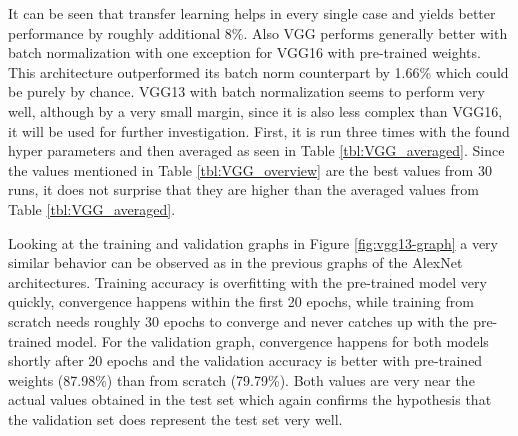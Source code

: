 It can be seen that transfer learning helps in every single case and yields better performance by roughly additional 8\%. Also VGG performs generally better with batch normalization with one exception for VGG16 with pre-trained weights. This architecture outperformed its batch norm counterpart by 1.66\% which could be purely by chance. VGG13 with batch normalization seems to perform very well, although by a very small margin, since it is also less complex than VGG16, it will be used for further investigation. First, it is run three times with the found hyper parameters and then averaged as seen in Table \ref{tbl:VGG_averaged}. Since the values mentioned in Table \ref{tbl:VGG_overview} are the best values from 30 runs, it does not surprise that they are higher than the averaged values from Table \ref{tbl:VGG_averaged}. \\


\begin{table}[!h] \centering
{}
\caption{Running the best VGG architecture three times with the found hyperparameters and averaging across the total of runs. }
\label{tbl:VGG_averaged}
\end{table}

\quad

Looking at the training and validation graphs in Figure \ref{fig:vgg13-graph} a very similar behavior can be observed as in the previous graphs of the AlexNet architectures. Training accuracy is overfitting with the pre-trained model very quickly, convergence happens within the first 20 epochs, while training from scratch needs roughly 30 epochs to converge and never catches up with the pre-trained model. For the validation graph, convergence happens for both models shortly after 20 epochs and the validation accuracy is better with pre-trained weights (87.98\%) than from scratch (79.79\%). Both values are very near the actual values obtained in the test set which again confirms the hypothesis that the validation set does represent the test set very well. \\


